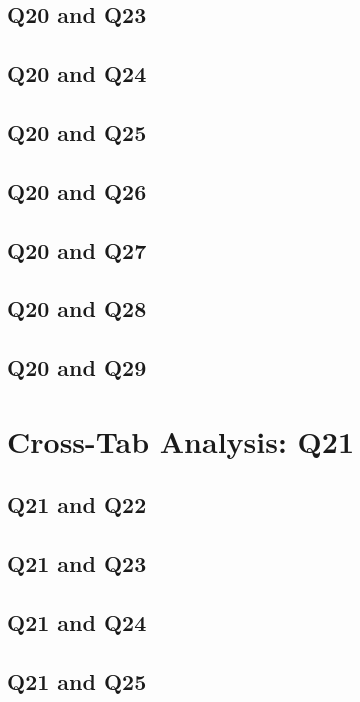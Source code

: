 \documentclass{report}
\begin{document}
\section{Q20 and Q23}\clearpage
\section{Q20 and Q24}\clearpage
\section{Q20 and Q25}\clearpage
\section{Q20 and Q26}\clearpage
\section{Q20 and Q27}\clearpage
\section{Q20 and Q28}\clearpage
\section{Q20 and Q29}\clearpage

\chapter{Cross-Tab Analysis: Q21}

\section{Q21 and Q22}\clearpage
\section{Q21 and Q23}\clearpage
\section{Q21 and Q24}\clearpage
\section{Q21 and Q25}\clearpage
\end{document}
